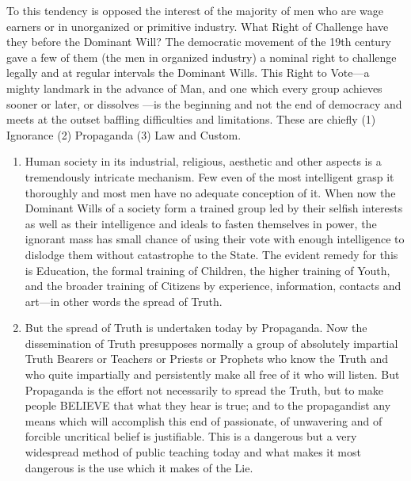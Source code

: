 \documentclass[letterpaper,10pt,english]{jupyterBook}
\begin{document}
\sphinxAtStartPar
To this tendency is opposed the interest of the majority of men who are wage earners or in unorganized or primitive industry. What Right of Challenge have they before the Dominant Will? The democratic movement of the 19th century gave a few of them (the men in organized industry) a nominal right to challenge legally and at regular intervals the Dominant Wills. This Right to Vote—a mighty landmark in the advance of Man, and one which every group achieves sooner or later, or dissolves —is the beginning and not the end of democracy and meets at the outset baffling difficulties and limitations. These are chiefly (1) Ignorance (2) Propaganda (3) Law and Custom.
\begin{enumerate}
%
\item {} 
\sphinxAtStartPar
Human society in its industrial, religious, aesthetic and other aspects is a tremendously intricate mechanism. Few even of the most intelligent grasp it thoroughly and most men have no adequate conception of it. When now the Dominant Wills of a society form a trained group led by their selfish interests as well as their intelligence and ideals to fasten themselves in power, the ignorant mass has small chance of using their vote with enough intelligence to dislodge them without catastrophe to the State. The evident remedy for this is Education, the formal training of Children, the higher training of Youth, and the broader training of Citizens by experience, information, contacts and art—in other words the spread of Truth.

\item {} 
\sphinxAtStartPar
But the spread of Truth is undertaken today by Propaganda. Now the dissemination of Truth presupposes normally a group of absolutely impartial Truth Bearers or Teachers or Priests or Prophets who know the Truth and who quite impartially and persistently make all free of it who will listen. But Propaganda is the effort not necessarily to spread the Truth, but to make people BELIEVE that what they hear is true; and to the propagandist any means which will accomplish this end of passionate, of unwavering and of forcible uncritical belief is justifiable. This is a dangerous but a very widespread method of public teaching today and what makes it most dangerous is the use which it makes of the Lie.


\end{enumerate}
\end{document}

